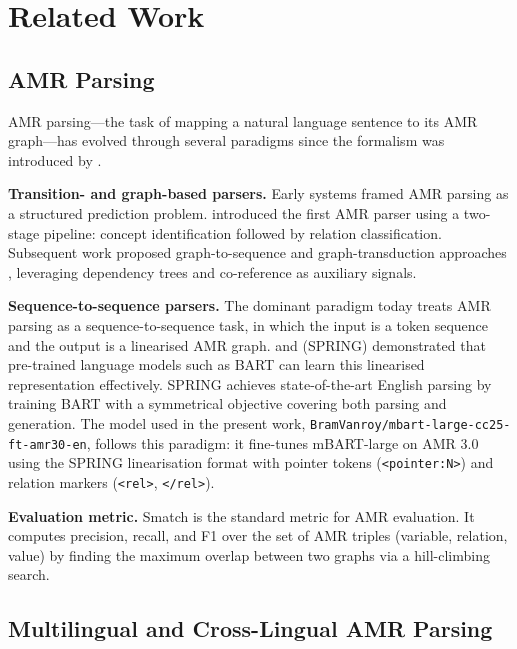 \section{Related Work}
\label{sec:related}

\subsection{AMR Parsing}

AMR parsing—the task of mapping a natural language sentence to its AMR graph—has evolved through several paradigms since the formalism was introduced by \citet{banarescu2013abstract}.

\textbf{Transition- and graph-based parsers.} Early systems framed AMR parsing as a structured prediction problem. \citet{flanigan2014discriminative} introduced the first AMR parser using a two-stage pipeline: concept identification followed by relation classification. Subsequent work proposed graph-to-sequence and graph-transduction approaches \cite{lyu2018amr, zhang2019amr}, leveraging dependency trees and co-reference as auxiliary signals.

\textbf{Sequence-to-sequence parsers.} The dominant paradigm today treats AMR parsing as a sequence-to-sequence task, in which the input is a token sequence and the output is a linearised AMR graph. \citet{xu2020improving} and \citet{bevilacqua2021one} (SPRING) demonstrated that pre-trained language models such as BART \cite{lewis2020bart} can learn this linearised representation effectively. SPRING achieves state-of-the-art English parsing by training BART with a symmetrical objective covering both parsing and generation. The model used in the present work, \texttt{BramVanroy/mbart-large-cc25-ft-amr30-en}, follows this paradigm: it fine-tunes mBART-large on AMR 3.0 using the SPRING linearisation format with pointer tokens (\texttt{<pointer:N>}) and relation markers (\texttt{<rel>}, \texttt{</rel>}).

\textbf{Evaluation metric.} Smatch \cite{cai2013smatch} is the standard metric for AMR evaluation. It computes precision, recall, and F1 over the set of AMR triples (variable, relation, value) by finding the maximum overlap between two graphs via a hill-climbing search.

\subsection{Multilingual and Cross-Lingual AMR Parsing}

